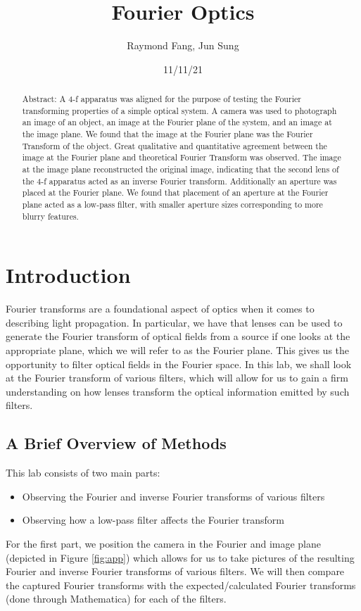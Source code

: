 \documentclass[twocolumn,amsmath,amssymb,pra]{revtex4-2}
\begin{document}
\title{Fourier Optics}

\author{Raymond Fang, Jun Sung}

\date{11/11/21}
\begin{abstract}
Abstract: A 4-f apparatus was aligned for the purpose of testing the Fourier transforming properties of a simple optical system. A camera was used to photograph an image of an object, an image at the Fourier plane of the system, and an image at the image plane. We found that the image at the Fourier plane was the Fourier Transform of the object. Great qualitative and quantitative agreement between the image at the Fourier plane and theoretical Fourier Transform was observed. The image at the image plane reconstructed the original image, indicating that the second lens of the 4-f apparatus acted as an inverse Fourier transform. Additionally an aperture was placed at the Fourier plane. We found that placement of an aperture at the Fourier plane acted as a low-pass filter, with smaller aperture sizes corresponding to more blurry features.
      
\end{abstract}
\maketitle

\section{Introduction}
Fourier transforms are a foundational aspect of optics when it comes to describing light propagation. In particular, we have that lenses can be used to generate the Fourier transform of optical fields from a source if one looks at the appropriate plane, which we will refer to as the Fourier plane. This gives us the opportunity to filter optical fields in the Fourier space. In this lab, we shall look at the Fourier transform of various filters, which will allow for us to gain a firm understanding on how lenses transform the optical information emitted by such filters.

\subsection{A Brief Overview of Methods}
This lab consists of two main parts:
\begin{itemize}
    \item Observing the Fourier and inverse Fourier transforms of various filters
    \item Observing how a low-pass filter affects the Fourier transform
\end{itemize}
For the first part, we position the camera in the Fourier and image plane (depicted in Figure \ref{fig:app}) which allows for us to take pictures of the resulting Fourier and inverse Fourier transforms of various filters. We will then compare the captured Fourier transforms with the expected/calculated Fourier transforms (done through Mathematica) for each of the filters.
\end{document}
